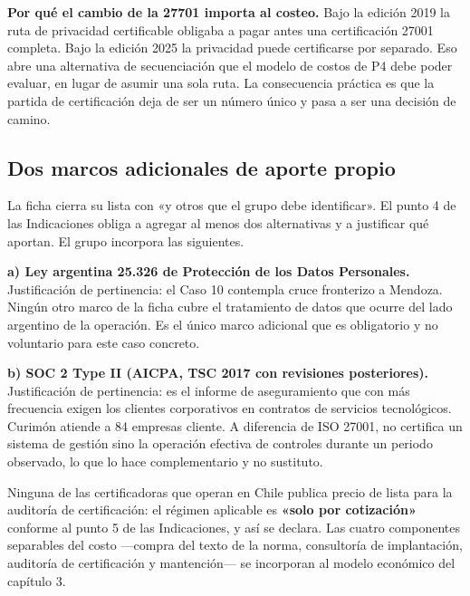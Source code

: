 \textbf{Por qué el cambio de la 27701 importa al costeo.} Bajo la edición 2019 la ruta de privacidad certificable obligaba a pagar antes una certificación 27001 completa. Bajo la edición 2025 la privacidad puede certificarse por separado. Eso abre una alternativa de secuenciación que el modelo de costos de P4 debe poder evaluar, en lugar de asumir una sola ruta. La consecuencia práctica es que la partida de certificación deja de ser un número único y pasa a ser una decisión de camino.

\subsection{Dos marcos adicionales de aporte propio}\label{dos-marcos-adicionales-de-aporte-propio}

La ficha cierra su lista con «y otros que el grupo debe identificar». El punto 4 de las Indicaciones obliga a agregar al menos dos alternativas y a justificar qué aportan. El grupo incorpora las siguientes.

\textbf{a) Ley argentina 25.326 de Protección de los Datos Personales.} Justificación de pertinencia: el Caso 10 contempla cruce fronterizo a Mendoza. Ningún otro marco de la ficha cubre el tratamiento de datos que ocurre del lado argentino de la operación. Es el único marco adicional que es obligatorio y no voluntario para este caso concreto.

\textbf{b) SOC 2 Type II (AICPA, TSC 2017 con revisiones posteriores).} Justificación de pertinencia: es el informe de aseguramiento que con más frecuencia exigen los clientes corporativos en contratos de servicios tecnológicos. Curimón atiende a 84 empresas cliente. A diferencia de ISO 27001, no certifica un sistema de gestión sino la operación efectiva de controles durante un periodo observado, lo que lo hace complementario y no sustituto.

Ninguna de las certificadoras que operan en Chile publica precio de lista para la auditoría de certificación: el régimen aplicable es \textbf{«solo por cotización»} conforme al punto 5 de las Indicaciones, y así se declara. Las cuatro componentes separables del costo ---compra del texto de la norma, consultoría de implantación, auditoría de certificación y mantención--- se incorporan al modelo económico del capítulo 3.
